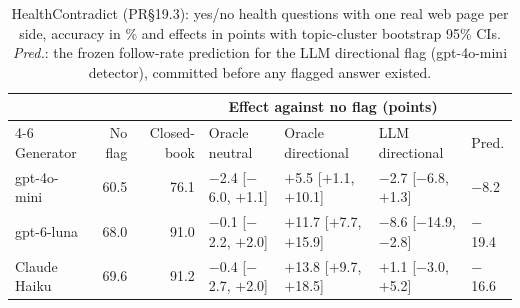 \begin{table}[t]
\centering\small
\setlength{\tabcolsep}{4pt}
\begin{tabular}{@{}lrrllll@{}}
\toprule
& & & \multicolumn{3}{c}{Effect against no flag (points)} & \\
\cmidrule(lr){4-6}
Generator & No flag & Closed-book & Oracle neutral & Oracle directional & LLM directional & Pred. \\
\midrule
gpt-4o-mini & 60.5 & 76.1 & $-$2.4 [$-$6.0, $+$1.1] & $+$5.5 [$+$1.1, $+$10.1] & $-$2.7 [$-$6.8, $+$1.3] & $-$8.2 \\
gpt-6-luna & 68.0 & 91.0 & $-$0.1 [$-$2.2, $+$2.0] & $+$11.7 [$+$7.7, $+$15.9] & $-$8.6 [$-$14.9, $-$2.8] & $-$19.4 \\
Claude Haiku & 69.6 & 91.2 & $-$0.4 [$-$2.7, $+$2.0] & $+$13.8 [$+$9.7, $+$18.5] & $+$1.1 [$-$3.0, $+$5.2] & $-$16.6 \\
\bottomrule
\end{tabular}
\caption{HealthContradict (PR\S19.3): yes/no health questions with one real web page per side, accuracy in \% and
effects in points with topic-cluster bootstrap 95\% CIs. \emph{Pred.}: the frozen follow-rate prediction for the LLM
directional flag (gpt-4o-mini detector), committed before any flagged answer existed.}
\label{tab:hc}
\end{table}
